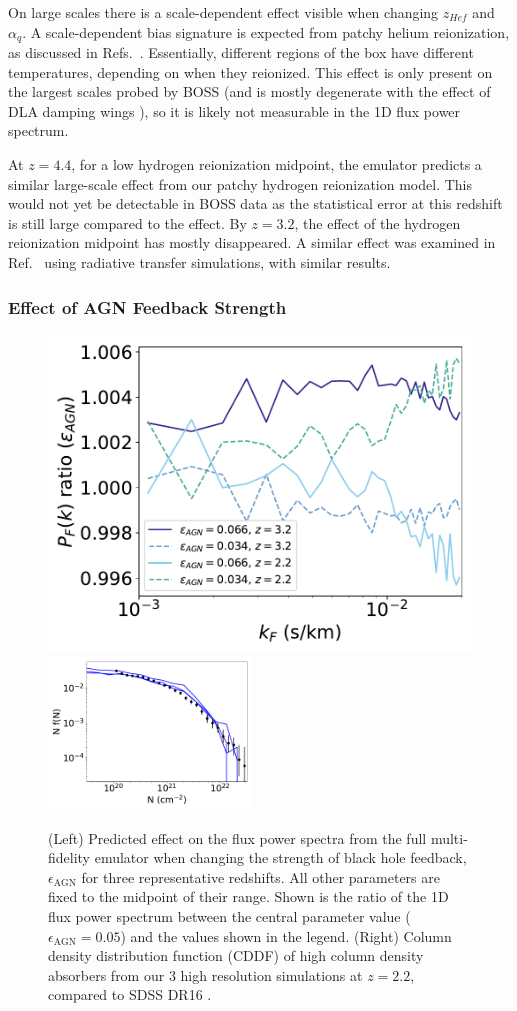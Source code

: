 \documentclass[a4paper,11pt]{article}
\begin{document}
On large scales there is a scale-dependent effect visible when changing $z_{Hef}$ and $\alpha_q$. A scale-dependent bias signature is expected from patchy helium reionization, as discussed in Refs.~\cite{Pontzen:2014a, Pontzen:2014b,  Gontcho:2014}. Essentially, different regions of the box have different temperatures, depending on when they reionized. This effect is only present on the largest scales probed by BOSS (and is mostly degenerate with the effect of DLA damping wings \cite{Rogers:2017}), so it is likely not measurable in the 1D flux power spectrum. %

At $z=4.4$, for a low hydrogen reionization midpoint, the emulator predicts a similar large-scale effect from our patchy hydrogen reionization model. This would not yet be detectable in BOSS data as the statistical error at this redshift is still large compared to the effect. By $z=3.2$, the effect of the hydrogen reionization midpoint has mostly disappeared. A similar effect was examined in Ref.~\cite{Molaro:2022} using radiative transfer simulations, with similar results.

\subsubsection{Effect of AGN Feedback Strength}
\label{sec:agnresult}

\begin{figure}
\centering
\includegraphics[width=0.48\columnwidth]{figures/single_param_bhfeedback.pdf}
\includegraphics[width=0.48\textwidth]{figures/cddf_hires.pdf}
 \caption{(Left) Predicted effect on the flux power spectra from the full multi-fidelity emulator when changing the strength of black hole feedback, $\epsilon_\mathrm{AGN}$ for three representative redshifts. All other parameters are fixed to the midpoint of their range. Shown is the ratio of the 1D flux power spectrum between the central parameter value ($\epsilon_\mathrm{AGN} = 0.05$) and the values shown in the legend.  (Right) Column density distribution function (CDDF) of high column density absorbers from our $3$ high resolution simulations at $z=2.2$, compared to SDSS DR16 \cite{2021MNRAS.507..704H}.}
 \label{fig:DLACDDF}
\end{figure}
\end{document}
